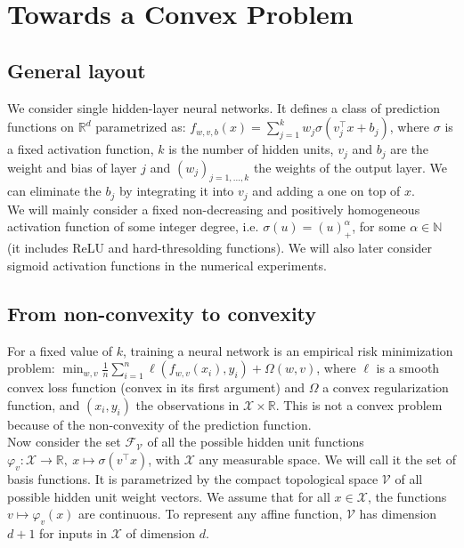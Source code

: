 \documentclass[a4paper, 11pt]{scrartcl}
\begin{document}
{\section{Towards a Convex Problem}

\subsection{General layout}

We consider single hidden-layer neural networks. It defines a class of prediction functions on $\mathbb{R}^d$ parametrized as: $f_{w, v, b}(x) =\sum_{j=1}^k w_j \sigma(v_j^\top x + b_j)$, where $\sigma$ is a fixed activation function, $k$ is the number of hidden units, $v_j$ and $b_j$ are the weight and bias of layer $j$ and $(w_j)_{j=1,...,k}$ the weights of the output layer. We can eliminate the $b_j$ by integrating it into $v_j$ and adding a one on top of $x$.\\

We will mainly consider a fixed non-decreasing and positively homogeneous  activation function of some integer degree, i.e. $\sigma(u) = (u)^\alpha_+$, for some $\alpha \in \mathbb{N}$ (it includes ReLU and hard-thresolding functions). We will also later consider sigmoid activation functions in the numerical experiments.

\subsection{From non-convexity to convexity}

For a fixed value of $k$, training a neural network is an empirical risk minimization problem: $\min_{w, v} \frac{1}{n} \sum_{i=1}^n \ell(f_{w, v}(x_i), y_i) + \Omega(w, v)$, where $\ell$ is a smooth convex loss function (convex in its first argument) and $\Omega$ a convex regularization function, and $(x_i, y_i)$ the observations in $\mathcal{X} \times \mathbb{R}$. This is not a convex problem because of the non-convexity of the prediction function.\\

Now consider the set $\mathcal{F}_\mathcal{V}$ of all the possible hidden unit functions $\varphi_v : \mathcal{X} \rightarrow \mathbb{R},~ x\mapsto \sigma(v^\top x)$, with $\mathcal{X}$ any measurable space. We will call it the set of basis functions. It is parametrized by the compact topological space $\mathcal{V}$ of all possible hidden unit weight vectors. We assume that for all $x \in \mathcal{X}$, the functions $v \mapsto \varphi_v(x)$ are continuous. To represent any affine function, $\mathcal{V}$ has dimension $d + 1$ for inputs in $\mathcal{X}$ of dimension $d$.

}
\end{document}
